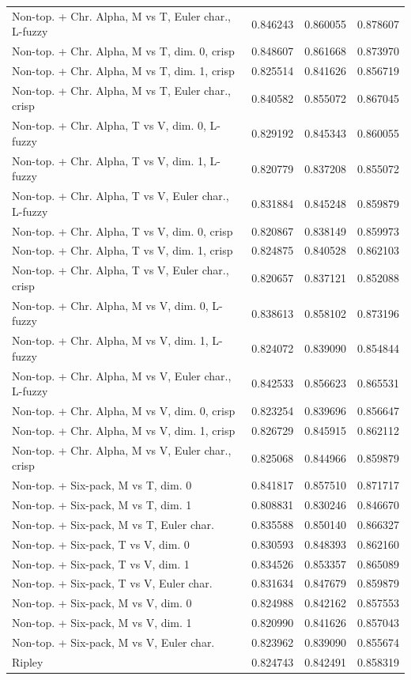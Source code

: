 \begin{longtable}{lrrr}
Non-top. + Chr. Alpha, M vs T, Euler char., L-fuzzy & 0.846243 & 0.860055 & 0.878607 \\
Non-top. + Chr. Alpha, M vs T, dim. 0, crisp & 0.848607 & 0.861668 & 0.873970 \\
Non-top. + Chr. Alpha, M vs T, dim. 1, crisp & 0.825514 & 0.841626 & 0.856719 \\
Non-top. + Chr. Alpha, M vs T, Euler char., crisp & 0.840582 & 0.855072 & 0.867045 \\
Non-top. + Chr. Alpha, T vs V, dim. 0, L-fuzzy & 0.829192 & 0.845343 & 0.860055 \\
Non-top. + Chr. Alpha, T vs V, dim. 1, L-fuzzy & 0.820779 & 0.837208 & 0.855072 \\
Non-top. + Chr. Alpha, T vs V, Euler char., L-fuzzy & 0.831884 & 0.845248 & 0.859879 \\
Non-top. + Chr. Alpha, T vs V, dim. 0, crisp & 0.820867 & 0.838149 & 0.859973 \\
Non-top. + Chr. Alpha, T vs V, dim. 1, crisp & 0.824875 & 0.840528 & 0.862103 \\
Non-top. + Chr. Alpha, T vs V, Euler char., crisp & 0.820657 & 0.837121 & 0.852088 \\
Non-top. + Chr. Alpha, M vs V, dim. 0, L-fuzzy & 0.838613 & 0.858102 & 0.873196 \\
Non-top. + Chr. Alpha, M vs V, dim. 1, L-fuzzy & 0.824072 & 0.839090 & 0.854844 \\
Non-top. + Chr. Alpha, M vs V, Euler char., L-fuzzy & 0.842533 & 0.856623 & 0.865531 \\
Non-top. + Chr. Alpha, M vs V, dim. 0, crisp & 0.823254 & 0.839696 & 0.856647 \\
Non-top. + Chr. Alpha, M vs V, dim. 1, crisp & 0.826729 & 0.845915 & 0.862112 \\
Non-top. + Chr. Alpha, M vs V, Euler char., crisp & 0.825068 & 0.844966 & 0.859879 \\
Non-top. + Six-pack, M vs T, dim. 0 & 0.841817 & 0.857510 & 0.871717 \\
Non-top. + Six-pack, M vs T, dim. 1 & 0.808831 & 0.830246 & 0.846670 \\
Non-top. + Six-pack, M vs T, Euler char. & 0.835588 & 0.850140 & 0.866327 \\
Non-top. + Six-pack, T vs V, dim. 0 & 0.830593 & 0.848393 & 0.862160 \\
Non-top. + Six-pack, T vs V, dim. 1 & 0.834526 & 0.853357 & 0.865089 \\
Non-top. + Six-pack, T vs V, Euler char. & 0.831634 & 0.847679 & 0.859879 \\
Non-top. + Six-pack, M vs V, dim. 0 & 0.824988 & 0.842162 & 0.857553 \\
Non-top. + Six-pack, M vs V, dim. 1 & 0.820990 & 0.841626 & 0.857043 \\
Non-top. + Six-pack, M vs V, Euler char. & 0.823962 & 0.839090 & 0.855674 \\
Ripley & 0.824743 & 0.842491 & 0.858319 \\
\end{longtable}
